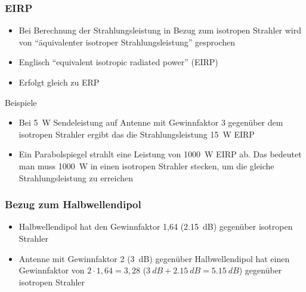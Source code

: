 \begin{frame}
    \frametitle{EIRP}
    \begin{itemize}
        \item Bei Berechnung der Strahlungsleistung in Bezug zum isotropen Strahler wird von \enquote{äquivalenter isotroper Strahlungsleistung} gesprochen
        \item Englisch \enquote{equivalent isotropic radiated power} (EIRP)
        \item Erfolgt gleich zu ERP
    \end{itemize}
    \pause
    \begin{exampleblock}{Beispiele}
        \begin{itemize}
            \item Bei 5~W Sendeleistung auf Antenne mit Gewinnfaktor 3 gegenüber
            dem isotropen Strahler ergibt das die Strahlungsleistung 15~W EIRP
            \item Ein Parabolspiegel strahlt eine Leistung von
            \qty{1000}{\watt} EIRP ab. Das bedeutet man muss \qty{1000}{\watt}
            in einen isotropen Strahler stecken, um die gleiche
            Strahlungsleistung zu erreichen
        \end{itemize}
    \end{exampleblock}
\end{frame}

\begin{frame}
    \frametitle{Bezug zum Halbwellendipol}
    \begin{itemize}
        \item Halbwellendipol hat den Gewinnfaktor 1,64 (\qty{2.15}{dB})
        gegenüber isotropen Strahler
        \item Antenne mit Gewinnfaktor 2 (\qty{3}{dB}) gegenüber Halbwellendipol
        hat einen Gewinnfaktor von $2 \cdot 1,64 = 3,28$ ($\qty{3}{dB} +
        \qty{2,15}{dB} = \qty{5,15}{dB}$) gegenüber isotropen Strahler
    \end{itemize}
\end{frame}

